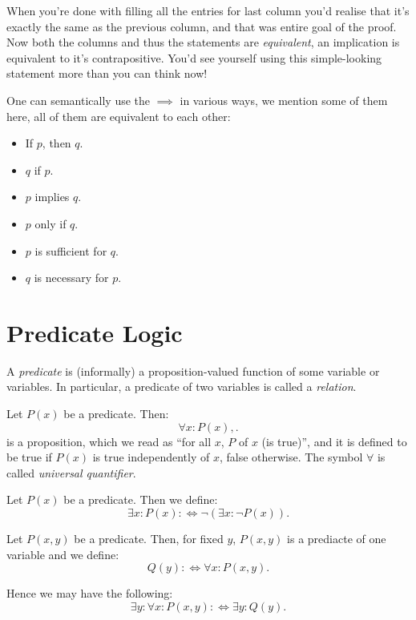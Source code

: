 \documentclass[a4paper]{article}
\begin{document}
\begin{Proof}
	When you're done with filling all the entries for last column you'd realise that it's exactly the same as the previous column, and that was entire goal of the proof. Now both the columns and thus the statements are \textit{equivalent}, an implication is equivalent to it's contrapositive. You'd see yourself using this simple-looking statement more than you can think now! 
\end{Proof}

\begin{remark}
One can semantically use the $\implies$ in various ways, we mention some of them here, all of them are equivalent to each other: 
\begin{itemize}
	\item  If $p$, then $q$.
	\item $q$ if $p$.
	\item $p$ implies $q$.
	\item $p$ only if $q$.
	\item $p$ is sufficient for $q$.
	\item $q$ is necessary for $p$.
\end{itemize}
\end{remark}

\section{Predicate Logic}

\begin{definition}
	A \textit{predicate} is (informally) a proposition-valued function of some variable or variables. In particular, a predicate of two variables is called a \textit{relation}.
\end{definition}

\begin{definition}
Let $P(x)$ be a predicate. Then:
\[
\forall x : P(x),
.\] 
is a proposition, which we read as ``for all $x$, $P$ of $x$ (is true)'', and it is defined to be true if $P(x)$ is true independently of $x$, false otherwise. The symbol $\forall$ is called \textit{universal quantifier}.
\end{definition}

\begin{definition}
Let $P(x)$ be a predicate. Then we define:
\[
\exists x : P(x) : \iff \neg\left( \exists x : \neg P(x) \right) 
.\] 
\end{definition}

\begin{eg}
Let $P(x,y)$ be a predicate. Then, for fixed $y$, $P(x,y)$ is a prediacte of one variable and we define:
\[
Q(y): \iff \forall x : P(x,y)
.\] 

Hence we may have the following:
\[
\exists y : \forall x : P(x,y): \iff \exists y : Q(y)
.\] 
\end{eg}
\end{document}

